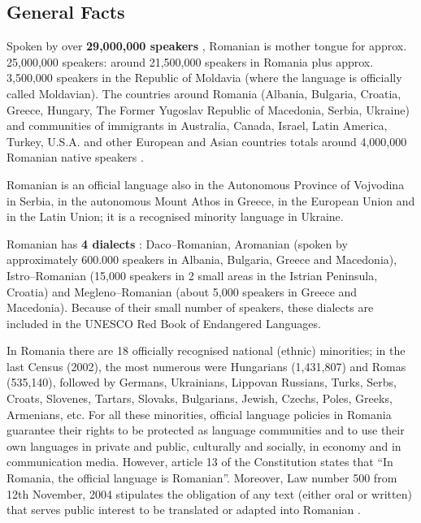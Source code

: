 \clearpage


\begin{multicols}{2}

\subsection{General Facts}

Spoken by over \textbf{29,000,000 speakers} \cite{vintila}, Romanian is mother tongue for approx. 25,000,000 speakers: around 21,500,000 speakers in Romania \cite{stat1} plus approx. 3,500,000 speakers in the Republic of Moldavia \cite{stat2} (where the language is officially called Moldavian). The countries around Romania (Albania, Bulgaria, Croatia, Greece, Hungary, The Former Yugoslav Republic of Macedonia, Serbia, Ukraine) and communities of immigrants in Australia, Canada, Israel, Latin America, Turkey, U.S.A. and other European and Asian countries totals around 4,000,000 Romanian native speakers \cite{urlRom_diaspora}.

Romanian is an official language also in the Autonomous Province of Vojvodina in Serbia, in the autonomous Mount Athos in Greece, in the European Union and in the Latin Union; it is a recognised minority language in Ukraine.

Romanian has \textbf{4 dialects} \cite{sala}: Daco--Romanian, Aromanian (spoken by approximately 600.000 speakers in Albania, Bulgaria, Greece and Macedonia), Istro--Romanian (15,000 speakers in 2 small areas in the Istrian Peninsula, Croatia) and Megleno--Romanian (about 5,000 speakers in Greece and Macedonia). Because of their small number of speakers, these dialects are included in the UNESCO Red Book of Endangered Languages.

In Romania there are 18 officially recognised national (ethnic) minorities; in the last Census (2002), the most numerous were Hungarians (1,431,807) and Romas (535,140), followed by Germans, Ukrainians, Lippovan Russians, Turks, Serbs, Croats, Slovenes, Tartars, Slovaks, Bulgarians, Jewish, Czechs, Poles, Greeks, Armenians, etc. For all these minorities, official language policies in Romania guarantee their rights to be protected as language communities and to use their own languages in private and public, culturally and socially, in economy and in communication media. However, article 13 of the Constitution states that “In Romania, the official language is Romanian”. Moreover, Law number 500 from 12th November, 2004 stipulates the obligation of any text (either oral or written) that serves public interest to be translated or adapted into Romanian \cite{urlEFNIL}.


\end{multicols}
